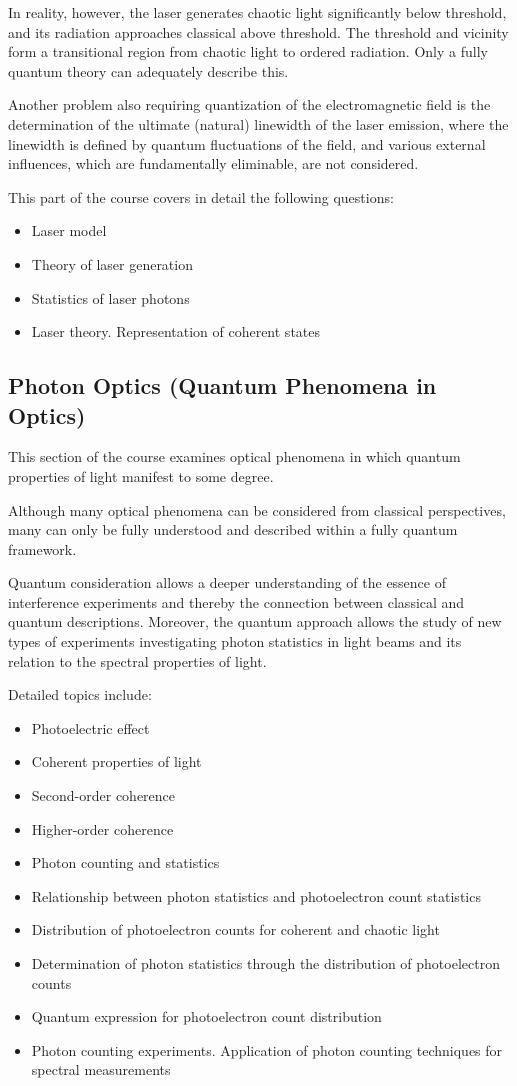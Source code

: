 In reality, however, the laser generates chaotic light significantly below threshold,
and its radiation approaches classical above threshold. The threshold and vicinity
form a transitional region from chaotic light to ordered radiation. Only
a fully quantum theory can adequately describe this.

Another problem also requiring quantization of the electromagnetic field
is the determination of the ultimate (natural) linewidth of the laser
emission, where the linewidth is defined by quantum fluctuations of the field,
and various external influences, which are fundamentally eliminable, are not considered.

This part of the course covers in detail the following questions:
\begin{itemize}
\item Laser model
\item Theory of laser generation
\item Statistics of laser photons
\item Laser theory. Representation of coherent states
\end{itemize}

\subsection{Photon Optics (Quantum Phenomena in Optics)}
This section of the course examines optical phenomena in which quantum
properties of light manifest to some degree.

Although many optical phenomena can be considered from classical perspectives,
many can only be fully understood and described within a fully quantum framework.

Quantum consideration allows a deeper understanding of the essence
of interference experiments and thereby the connection between
classical and quantum descriptions. Moreover, the quantum approach
allows the study of new types of experiments investigating
photon statistics in light beams and its relation to the spectral
properties of light.

Detailed topics include:
\begin{itemize}
\item Photoelectric effect
\item Coherent properties of light
\item Second-order coherence
\item Higher-order coherence
\item Photon counting and statistics
\item Relationship between photon statistics and photoelectron count statistics
\item Distribution of photoelectron counts for coherent and chaotic light
\item Determination of photon statistics through the distribution
  of photoelectron counts
\item Quantum expression for photoelectron count distribution
\item Photon counting experiments. Application of photon counting
  techniques for spectral measurements
\end{itemize} 

